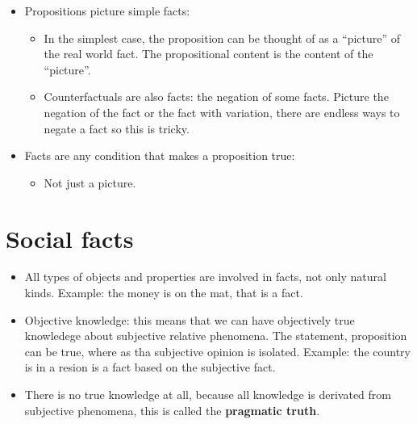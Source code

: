 \begin{itemize}
    \item Propositions picture simple facts: 
        \begin{itemize}
            \item In the simplest case, the proposition can be thought of as a ``picture'' of the real world fact. The propositional content is the content of the ``picture''.
            \item Counterfactuals are also facts: the negation of some facts. Picture the negation of the fact or the fact with variation, there are endless ways to negate a fact so this is tricky.
        \end{itemize}
    
    \item Facts are any condition that makes a proposition true: 
        \begin{itemize}
            \item Not just a picture.
        \end{itemize}
\end{itemize}



\section{Social facts}
\begin{itemize}
    \item All types of objects and properties are involved in facts, not only natural kinds. Example: the money is on the mat, that is a fact.
    \item Objective knowledge: this means that we can have objectively true knowledege about subjective relative phenomena. The statement, proposition can be true, where as tha subjective opinion is isolated. Example: the country is in a resion is a fact based on the subjective fact.
    \item There is no true knowledge at all, because all knowledge is derivated from subjective phenomena, this is called the \textbf{pragmatic truth}.
\end{itemize}


